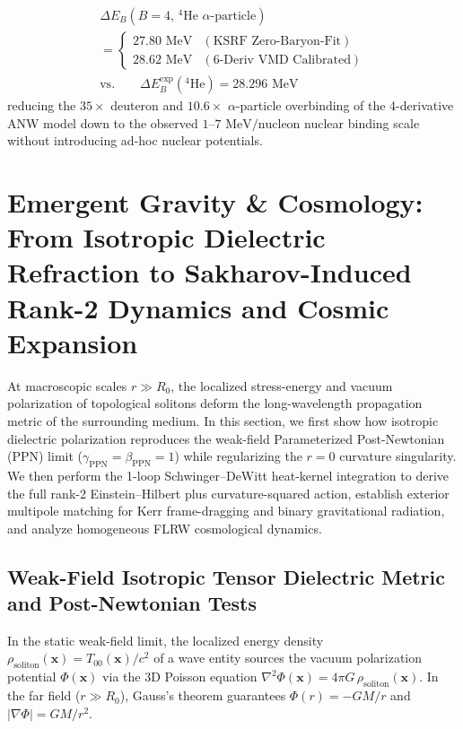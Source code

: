 \documentclass[10pt,aps,prd,twocolumn,superscriptaddress,nofootinbib,floatfix,longbibliography,showkeys]{revtex4-2}
\begin{document}
\begin{equation}\begin{gathered}
\Delta E_B(B=4, \,^4\text{He }\alpha\text{-particle}) \\
= \begin{cases} 27.80\text{ MeV} & (\text{KSRF Zero-Baryon-Fit}) \\ 28.62\text{ MeV} & (\text{6-Deriv }\text{VMD Calibrated}) \end{cases} \\
\text{vs.} \qquad \Delta E_B^{\text{exp}}(^4\text{He}) = 28.296\text{ MeV}
\end{gathered}\end{equation}
reducing the $35\times$ deuteron and $10.6\times$ $\alpha$-particle overbinding of the 4-derivative ANW model down to the observed $1\text{--}7\text{ MeV/nucleon}$ nuclear binding scale without introducing ad-hoc nuclear potentials.



\section{Emergent Gravity \& Cosmology: From Isotropic Dielectric Refraction to Sakharov-Induced Rank-2 Dynamics and Cosmic Expansion}\label{sec:5}

At macroscopic scales $r \gg R_0$, the localized stress-energy and vacuum polarization of topological solitons deform the long-wavelength propagation metric of the surrounding medium. In this section, we first show how isotropic dielectric polarization reproduces the weak-field Parameterized Post-Newtonian (PPN) limit ($\gamma_{\text{PPN}} = \beta_{\text{PPN}} = 1$) while regularizing the $r=0$ curvature singularity. We then perform the 1-loop Schwinger--DeWitt heat-kernel integration to derive the full rank-2 Einstein--Hilbert plus curvature-squared action, establish exterior multipole matching for Kerr frame-dragging and binary gravitational radiation, and analyze homogeneous FLRW cosmological dynamics.


\subsection{Weak-Field Isotropic Tensor Dielectric Metric and Post-Newtonian Tests}\label{sec:5.1}

In the static weak-field limit, the localized energy density $\rho_{\text{soliton}}(\mathbf{x}) = T_{00}(\mathbf{x})/c^2$ of a wave entity sources the vacuum polarization potential $\Phi(\mathbf{x})$ via the 3D Poisson equation $\nabla^2 \Phi(\mathbf{x}) = 4\pi G\,\rho_{\text{soliton}}(\mathbf{x})$. In the far field ($r \gg R_0$), Gauss's theorem guarantees $\Phi(r) = -GM/r$ and $|\nabla \Phi| = GM/r^2$.
\end{document}
